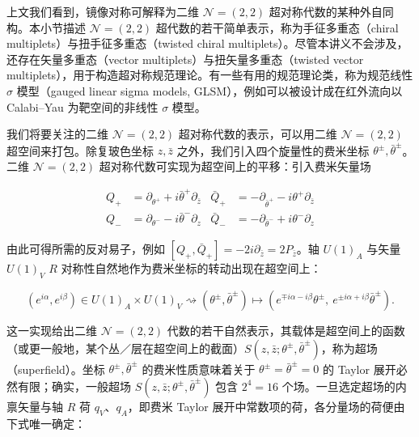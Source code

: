 上文我们看到，镜像对称可解释为二维 $\mathcal{N}=(2,2)$ 超对称代数的某种外自同构。本小节描述 $\mathcal{N}=(2,2)$ 超代数的若干简单表示，称为手征多重态（chiral multiplets）与扭手征多重态（twisted chiral multiplets）。尽管本讲义不会涉及，还存在矢量多重态（vector multiplets）与扭矢量多重态（twisted vector multiplets），用于构造超对称规范理论。有一些有用的规范理论类，称为规范线性 $\sigma$ 模型（gauged linear sigma models, GLSM），例如可以被设计成在红外流向以 Calabi--Yau 为靶空间的非线性 $\sigma$ 模型。

我们将要关注的二维 $\mathcal{N}=(2,2)$ 超对称代数的表示，可以用二维 $\mathcal{N}=(2,2)$ 超空间来打包。除复玻色坐标 $z,\bar z$ 之外，我们引入四个旋量性的费米坐标 $\theta^\pm,\bar\theta^\pm$。二维 $\mathcal{N}=(2,2)$ 超对称代数可实现为超空间上的平移：引入费米矢量场

\begin{equation}
\begin{aligned}
Q_+ &= \partial_{\theta^+} + i\bar\theta^+\partial_{\bar z} & \bar Q_+ &= -\partial_{\bar\theta^+} - i\theta^+\partial_{\bar z}\\
Q_- &= \partial_{\theta^-} - i\bar\theta^-\partial_z & \bar Q_- &= -\partial_{\bar\theta^-} + i\theta^-\partial_z
\end{aligned}\tag{2.11}
\end{equation}

由此可得所需的反对易子，例如 $[Q_+,\bar Q_+]=-2i\partial_{\bar z}=2P_{\bar z}$。轴 $U(1)_A$ 与矢量 $U(1)_V$ $R$ 对称性自然地作为费米坐标的转动出现在超空间上：


\begin{equation}
(e^{i\alpha},e^{i\beta})\in U(1)_A\times U(1)_V \rightsquigarrow (\theta^\pm,\bar\theta^\pm)\mapsto (e^{\mp i\alpha-i\beta}\theta^\pm,\ e^{\pm i\alpha+i\beta}\bar\theta^\pm).
\tag{2.12}
\end{equation}

这一实现给出二维 $\mathcal{N}=(2,2)$ 代数的若干自然表示，其载体是超空间上的函数（或更一般地，某个丛／层在超空间上的截面）$S(z,\bar z;\theta^\pm,\bar\theta^\pm)$，称为超场（superfield）。坐标 $\theta^\pm,\bar\theta^\pm$ 的费米性质意味着关于 $\theta^\pm=\bar\theta^\pm=0$ 的 Taylor 展开必然有限；确实，一般超场 $S(z,\bar z;\theta^\pm,\bar\theta^\pm)$ 包含 $2^4=16$ 个场。一旦选定超场的内禀矢量与轴 $R$ 荷 $q_V$、$q_A$，即费米 Taylor 展开中常数项的荷，各分量场的荷便由下式唯一确定：

